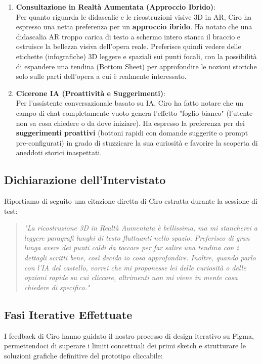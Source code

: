 \begin{enumerate}[leftmargin=1.5em]
    \item \textbf{Consultazione in Realtà Aumentata (Approccio Ibrido)}:\\
    Per quanto riguarda le didascalie e le ricostruzioni visive 3D in AR, Ciro ha espresso una netta preferenza per un \textbf{approccio ibrido}. Ha notato che una didascalia AR troppo carica di testo a schermo intero stanca il braccio e ostruisce la bellezza visiva dell'opera reale. Preferisce quindi vedere delle etichette (infografiche) 3D leggere e spaziali sui punti focali, con la possibilità di espandere una tendina (Bottom Sheet) per approfondire le nozioni storiche solo sulle parti dell'opera a cui è realmente interessato.
    
    \item \textbf{Cicerone IA (Proattività e Suggerimenti)}:\\
    Per l'assistente conversazionale basato su IA, Ciro ha fatto notare che un campo di chat completamente vuoto genera l'effetto "foglio bianco" (l'utente non sa cosa chiedere o da dove iniziare). Ha espresso la preferenza per dei \textbf{suggerimenti proattivi} (bottoni rapidi con domande suggerite o prompt pre-configurati) in grado di stuzzicare la sua curiosità e favorire la scoperta di aneddoti storici inaspettati.
\end{enumerate}

\subsection{Dichiarazione dell'Intervistato}
Riportiamo di seguito una citazione diretta di Ciro estratta durante la sessione di test:

\begin{quote}
    \textit{"La ricostruzione 3D in Realtà Aumentata è bellissima, ma mi stancherei a leggere paragrafi lunghi di testo fluttuanti nello spazio. Preferisco di gran lunga avere dei punti caldi da toccare per far salire una tendina con i dettagli scritti bene, così decido io cosa approfondire. Inoltre, quando parlo con l'IA del castello, vorrei che mi proponesse lei delle curiosità o delle opzioni rapide su cui cliccare, altrimenti non mi viene in mente cosa chiedere di specifico."}
\end{quote}

\subsection{Fasi Iterative Effettuate}
I feedback di Ciro hanno guidato il nostro processo di design iterativo su Figma, permettendoci di superare i limiti concettuali dei primi sketch e strutturare le soluzioni grafiche definitive del prototipo cliccabile:

